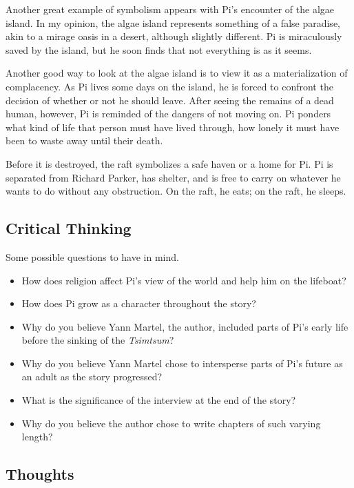 \documentclass[11pt]{article}
\begin{document}
Another great example of symbolism appears with Pi's encounter of the algae island. In my opinion, the algae island represents something of a false paradise, akin to a mirage oasis in a desert, although slightly different. Pi is miraculously saved by the island, but he soon finds that not everything is as it seems.

Another good way to look at the algae island is to view it as a materialization of complacency. As Pi lives some days on the island, he is forced to confront the decision of whether or not he should leave. After seeing the remains of a dead human, however, Pi is reminded of the dangers of not moving on. Pi ponders what kind of life that person must have lived through, how lonely it must have been to waste away until their death.

Before it is destroyed, the raft symbolizes a safe haven or a home for Pi. Pi is separated from Richard Parker, has shelter, and is free to carry on whatever he wants to do without any obstruction. On the raft, he eats; on the raft, he sleeps.

\subsection{Critical Thinking}
\label{sec:org9e3eb05}

Some possible questions to have in mind.

\begin{itemize}
\item How does religion affect Pi's view of the world and help him on the lifeboat?
\item How does Pi grow as a character throughout the story?
\item Why do you believe Yann Martel, the author, included parts of Pi's early life before the sinking of the \emph{Tsimtsum}?
\item Why do you believe Yann Martel chose to intersperse parts of Pi's future as an adult as the story progressed?
\item What is the significance of the interview at the end of the story?
\item Why do you believe the author chose to write chapters of such varying length?
\end{itemize}

\subsection{Thoughts}
\label{sec:org1b39935}
\end{document}
